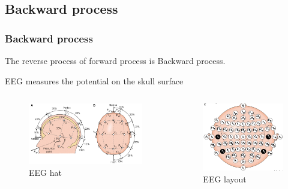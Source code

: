 \documentclass{beamer}
\begin{document}
\subsection{Backward process}
\begin{frame}
    \frametitle{Backward process}
    The reverse process of forward process is Backward process.

    EEG measures the potential on the skull surface
    \begin{columns}
        \begin{figure}[H]
            \centering
            \includegraphics[height=0.4\textheight]{EEG_hat.png}
            \caption{EEG hat}
            \label{fig: EEG hat}
        \end{figure}

        \begin{figure}[H]
            \centering
            \includegraphics[height=0.4\textheight]{EEG_layout.png}
            \caption{EEG layout}
            \label{fig: EEG layout}
        \end{figure}
    \end{columns}
\end{frame}
\end{document}
